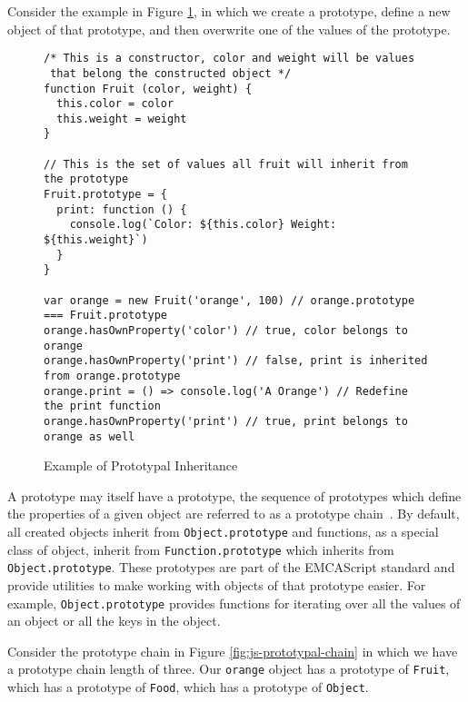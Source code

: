\documentclass[]{final_report}
\begin{document}
Consider the example in Figure \ref{fig:js-prototypical-inheritance}, in which we create a prototype, define a new object of that prototype, and then overwrite one of the values of the prototype.

\begin{figure}[t]
\begin{verbatim}
/* This is a constructor, color and weight will be values
 that belong the constructed object */
function Fruit (color, weight) {
  this.color = color
  this.weight = weight
}

// This is the set of values all fruit will inherit from the prototype
Fruit.prototype = {
  print: function () {
    console.log(`Color: ${this.color} Weight: ${this.weight}`)
  }
}

var orange = new Fruit('orange', 100) // orange.prototype === Fruit.prototype
orange.hasOwnProperty('color') // true, color belongs to orange
orange.hasOwnProperty('print') // false, print is inherited from orange.prototype
orange.print = () => console.log('A Orange') // Redefine the print function
orange.hasOwnProperty('print') // true, print belongs to orange as well
\end{verbatim}
\caption{\label{fig:js-prototypical-inheritance} Example of Prototypal Inheritance}
\end{figure} 

A prototype may itself have a prototype, the sequence of prototypes which define the properties of a given object are referred to as a prototype chain~\cite{EcmaScript, borning1986classes}. By default, all created objects inherit from \lstinline{Object.prototype} and functions, as a special class of object, inherit from \lstinline{Function.prototype} which inherits from \lstinline{Object.prototype}. These prototypes are part of the EMCAScript standard and provide utilities to make working with objects of that prototype easier. For example, \lstinline{Object.prototype} provides functions for iterating over all the values of an object or all the keys in the object.

Consider the prototype chain in Figure \ref{fig:js-prototypal-chain} in which we have a prototype chain length of three. Our \lstinline{orange} object has a prototype of \lstinline{Fruit}, which has a prototype of \lstinline{Food}, which has a prototype of \lstinline{Object}.
\end{document}
